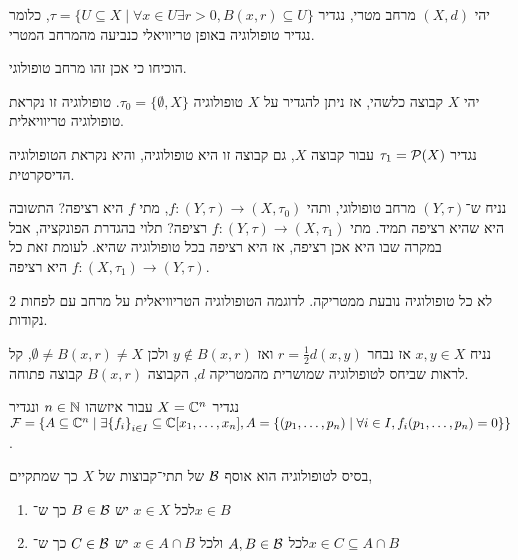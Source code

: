 \begin{example}
	יהי $(X, d)$ מרחב מטרי, נגדיר $\tau = \{ U \subseteq X \mid \forall x \in U \exists r > 0, B(x, r) \subseteq U \}$, כלומר נגדיר טופולוגיה באופן טריוויאלי כנביעה מהמרחב המטרי.
\end{example}
\begin{exercise}
	הוכיחו כי אכן זהו מרחב טופולוגי.
\end{exercise}
\begin{example}
	יהי $X$ קבוצה כלשהי, אז ניתן להגדיר על $X$ טופולוגיה $\tau_0 = \{ \emptyset, X \}$.
	טופולוגיה זו נקראת טופולוגיה טריוויאלית.
\end{example}
\begin{example}
	נגדיר $\tau_1 = \mathcal{P}(X)$ עבור קבוצה $X$, גם קבוצה זו היא טופולוגיה, והיא נקראת הטופולוגיה הדיסקרטית.
\end{example}
\begin{example}
	נניח ש־$(Y, \tau)$ מרחב טופולוגי, ותהי $f : (Y, \tau) \to (X, \tau_0)$, מתי $f$ היא רציפה? התשובה היא שהיא רציפה תמיד.
	מתי $f : (Y, \tau) \to (X, \tau_1)$ רציפה? תלוי בהגדרת הפונקציה, אבל במקרה שבו היא אכן רציפה, אז היא רציפה בכל טופולוגיה שהיא.
	לעומת זאת כל $f : (X, \tau_1) \to (Y, \tau)$ היא רציפה.
\end{example}
\begin{remark}
	לא כל טופולוגיה נובעת ממטריקה.
	לדוגמה הטופולוגיה הטריוויאלית על מרחב עם לפחות 2 נקודות.
\end{remark}
\begin{remark}
	נניח $x, y \in X$ אז נבחר $r = \frac{1}{2} d(x, y)$ ואז $y \notin B(x, r)$ ולכן $\emptyset \ne B(x, r) \ne X$, קל לראות שביחס לטופולוגיה שמושרית מהמטריקה $d$, הקבוצה $B(x, r)$ קבוצה פתוחה.
\end{remark}
\begin{example}
	נגדיר $X = \mathbb{C}^n$ עבור איזשהו $n \in \mathbb{N}$ ונגדיר $\mathcal{F} = \{ A \subseteq \mathbb{C}^n \mid \exists {\{f_i\}}_{i \in I} \subseteq \mathbb{C}[x_1, \dots, x_n], A = \{(p_1, \dots, p_n) \mid \forall i \in I, f_i(p_1, \dots, p_n) = 0 \}\}$.
\end{example}
\begin{definition}\label{topology_basis_definition}
	בסיס לטופולוגיה הוא אוסף $\mathcal{B}$ של תתי־קבוצות של $X$ כך שמתקיים,
	\begin{enumerate}
		\item לכל $x \in X$ יש $B \in \mathcal{B}$ כך ש־$x \in B$
		\item לכל $A, B \in \mathcal{B}$ ולכל $x \in A \cap B$ יש $C \in \mathcal{B}$ כך ש־$x \in C \subseteq A \cap B$
	\end{enumerate}
\end{definition}
